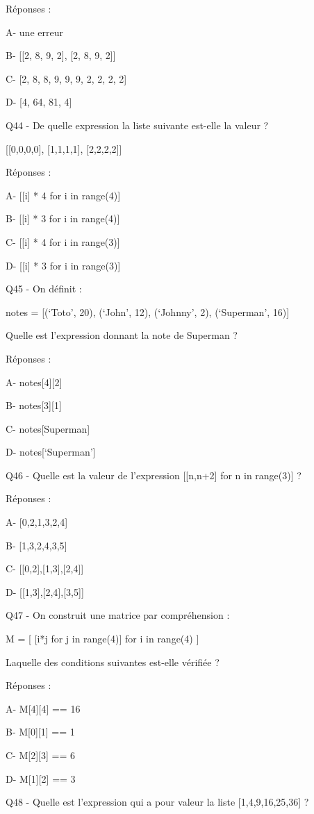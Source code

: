 \documentclass[
]{book}
\begin{document}
Réponses :

A- une erreur

B- {[}{[}2, 8, 9, 2{]}, {[}2, 8, 9, 2{]}{]}

C- {[}2, 8, 8, 9, 9, 9, 2, 2, 2, 2{]}

D- {[}4, 64, 81, 4{]}

Q44 - De quelle expression la liste suivante est-elle la valeur ?

{[}{[}0,0,0,0{]}, {[}1,1,1,1{]}, {[}2,2,2,2{]}{]}

Réponses :

A- {[}{[}i{]} * 4 for i in range(4){]}

B- {[}{[}i{]} * 3 for i in range(4){]}

C- {[}{[}i{]} * 4 for i in range(3){]}

D- {[}{[}i{]} * 3 for i in range(3){]}

Q45 - On définit :

notes = {[}(`Toto', 20), (`John', 12), (`Johnny', 2), (`Superman', 16){]}

Quelle est l'expression donnant la note de Superman ?

Réponses :

A- notes{[}4{]}{[}2{]}

B- notes{[}3{]}{[}1{]}

C- notes{[}Superman{]}

D- notes{[}`Superman'{]}

Q46 - Quelle est la valeur de l'expression {[}{[}n,n+2{]} for n in range(3){]} ?

Réponses :

A- {[}0,2,1,3,2,4{]}

B- {[}1,3,2,4,3,5{]}

C- {[}{[}0,2{]},{[}1,3{]},{[}2,4{]}{]}

D- {[}{[}1,3{]},{[}2,4{]},{[}3,5{]}{]}

Q47 - On construit une matrice par compréhension :

M = {[} {[}i*j for j in range(4){]} for i in range(4) {]}

Laquelle des conditions suivantes est-elle vérifiée ?

Réponses :

A- M{[}4{]}{[}4{]} == 16

B- M{[}0{]}{[}1{]} == 1

C- M{[}2{]}{[}3{]} == 6

D- M{[}1{]}{[}2{]} == 3

Q48 - Quelle est l'expression qui a pour valeur la liste {[}1,4,9,16,25,36{]} ?
\end{document}
